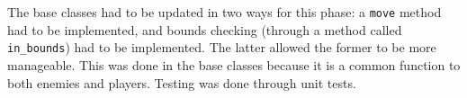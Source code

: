 The base classes had to be updated in two ways for this phase: a \texttt{move} method had to be implemented, and bounds checking (through a method called \texttt{in_bounds}) had to be implemented.  The latter allowed the former to be more manageable.  This was done in the base classes because it is a common function to both enemies and players.  Testing was done through unit tests.
